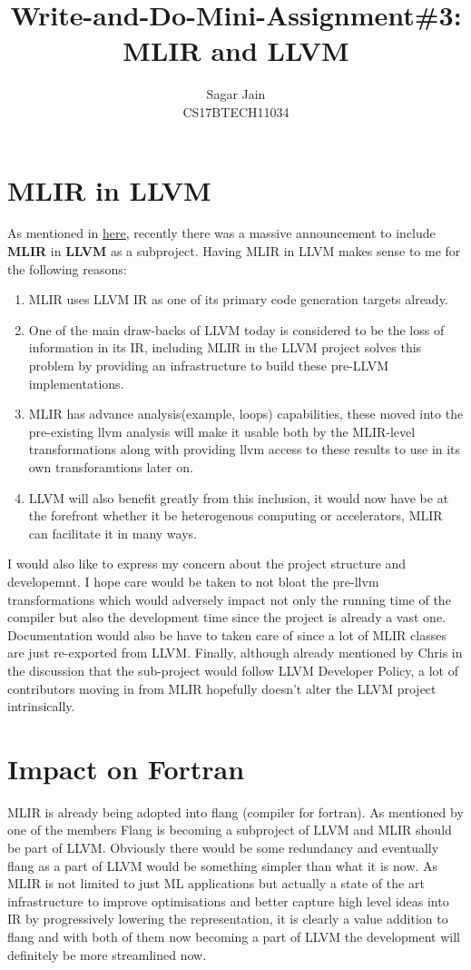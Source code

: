 \documentclass[12pt]{article}
\begin{document}
\title{Write-and-Do-Mini-Assignment\#3: MLIR and LLVM}
\author{Sagar Jain\\CS17BTECH11034}
\maketitle
\section*{MLIR in LLVM}
As mentioned in \href{https://groups.google.com/forum/#!topic/llvm-dev/_9dr6ZvWWAQ/discussion}{here}, recently there was a massive announcement to include \textbf{MLIR} in \textbf{LLVM} as a subproject. Having MLIR in LLVM makes sense to me for the following reasons:
\begin{enumerate}
\item MLIR uses LLVM IR as one of its primary code generation targets already.
\item One of the main draw-backs of LLVM today is considered to be the loss of information in its IR, including MLIR in the LLVM project solves this problem by providing an infrastructure to build these pre-LLVM implementations.
\item MLIR has advance analysis(example, loops) capabilities, these moved into the pre-existing llvm analysis will make it usable both by the MLIR-level transformations along with providing llvm access to these results to use in its own transforamtions later on.
\item LLVM will also benefit greatly from this inclusion, it would now have be at the forefront whether it be heterogenous computing or accelerators, MLIR can facilitate it in many ways.
\end{enumerate}
I would also like to express my concern about the project structure and developemnt. I hope care would be taken to not bloat the pre-llvm transformations which would adversely impact not only the running time of the compiler but also the development time since the project is already a vast one. Documentation would also be have to taken care of since a lot of MLIR classes are just re-exported from LLVM. Finally, although already mentioned by Chris in the discussion that the sub-project would follow  LLVM Developer Policy, a lot of contributors moving in from MLIR hopefully doesn't alter the LLVM project intrinsically.
\section*{Impact on Fortran}
MLIR is already being adopted into flang (compiler for fortran). As mentioned by one of the members Flang is becoming a subproject of LLVM and MLIR should be part of LLVM. Obviously there would be some redundancy and eventually flang as a part of LLVM would be something simpler than what it is now. As MLIR is not limited to just ML applications but actually a state of the art infrastructure to improve optimisations and better capture high level ideas into IR by progressively lowering the representation, it is clearly a value addition to flang and with both of them now becoming a part of LLVM the development will definitely be more streamlined now.
\end{document}
